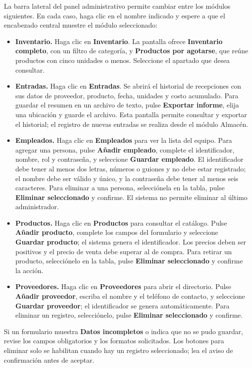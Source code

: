 \documentclass[12pt,a4paper]{article}
\begin{document}
La barra lateral del panel administrativo permite cambiar entre los módulos siguientes. En cada caso, haga clic en el nombre indicado y espere a que el encabezado central muestre el módulo seleccionado:
\begin{itemize}
\item \textbf{Inventario.} Haga clic en \textbf{Inventario}. La pantalla ofrece \textbf{Inventario completo}, con un filtro de categoría, y \textbf{Productos por agotarse}, que reúne productos con cinco unidades o menos. Seleccione el apartado que desea consultar.
\item \textbf{Entradas.} Haga clic en \textbf{Entradas}. Se abrirá el historial de recepciones con sus datos de proveedor, producto, fecha, unidades y costo acumulado. Para guardar el resumen en un archivo de texto, pulse \textbf{Exportar informe}, elija una ubicación y guarde el archivo. Esta pantalla permite consultar y exportar el historial; el registro de nuevas entradas se realiza desde el módulo Almacén.
\item \textbf{Empleados.} Haga clic en \textbf{Empleados} para ver la lista del equipo. Para agregar una persona, pulse \textbf{Añadir empleado}, complete el identificador, nombre, rol y contraseña, y seleccione \textbf{Guardar empleado}. El identificador debe tener al menos dos letras, números o guiones y no debe estar registrado; el nombre debe ser válido y único, y la contraseña debe tener al menos seis caracteres. Para eliminar a una persona, selecciónela en la tabla, pulse \textbf{Eliminar seleccionado} y confirme. El sistema no permite eliminar al último administrador.
\item \textbf{Productos.} Haga clic en \textbf{Productos} para consultar el catálogo. Pulse \textbf{Añadir producto}, complete los campos del formulario y seleccione \textbf{Guardar producto}; el sistema genera el identificador. Los precios deben ser positivos y el precio de venta debe superar al de compra. Para retirar un producto, selecciónelo en la tabla, pulse \textbf{Eliminar seleccionado} y confirme la acción.
\item \textbf{Proveedores.} Haga clic en \textbf{Proveedores} para abrir el directorio. Pulse \textbf{Añadir proveedor}, escriba el nombre y el teléfono de contacto, y seleccione \textbf{Guardar proveedor}; el identificador se genera automáticamente. Para eliminar un registro, selecciónelo, pulse \textbf{Eliminar seleccionado} y confirme.
\end{itemize}
Si un formulario muestra \textbf{Datos incompletos} o indica que no se pudo guardar, revise los campos obligatorios y los formatos solicitados. Los botones para eliminar solo se habilitan cuando hay un registro seleccionado; lea el aviso de confirmación antes de aceptar.
\end{document}
